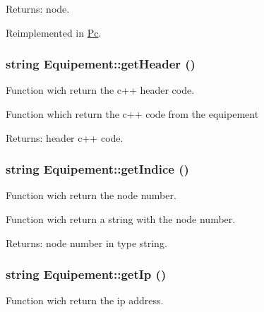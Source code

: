 \begin{Desc}
\item[Returns:]node. \end{Desc}


Reimplemented in \hyperlink{class_pc_e72f59f25f046967f021e56a90281d77}{Pc}.\hypertarget{class_equipement_46225506a8202eab2f688ce23e14ce97}{
\subsubsection[{getHeader}]{\setlength{\rightskip}{0pt plus 5cm}string Equipement::getHeader ()}}
\label{class_equipement_46225506a8202eab2f688ce23e14ce97}


Function wich return the c++ header code. 

Function which return the c++ code from the equipement

\begin{Desc}
\item[Returns:]header c++ code. \end{Desc}
\hypertarget{class_equipement_59cfa2b20bf9b66d150f353a0316eeae}{
\subsubsection[{getIndice}]{\setlength{\rightskip}{0pt plus 5cm}string Equipement::getIndice ()}}
\label{class_equipement_59cfa2b20bf9b66d150f353a0316eeae}


Function wich return the node number. 

Function wich return a string with the node number.

\begin{Desc}
\item[Returns:]node number in type string. \end{Desc}
\hypertarget{class_equipement_1b589d4b1c6580ceeb3f8ce9c6e8d579}{
\subsubsection[{getIp}]{\setlength{\rightskip}{0pt plus 5cm}string Equipement::getIp ()}}
\label{class_equipement_1b589d4b1c6580ceeb3f8ce9c6e8d579}


Function wich return the ip address. 


